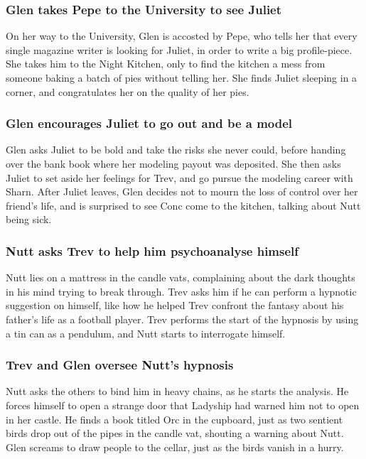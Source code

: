 \subsubsection{\Gls{Glen} takes \Gls{Pepe} to the University to see \Gls{Juliet}}
On her way to the University, \Gls{Glen} is accosted by \Gls{Pepe}, who tells her that every single
magazine writer is looking for \Gls{Juliet}, in order to write a big profile-piece. She takes him
to the Night Kitchen, only to find the kitchen a mess from someone baking a batch of pies without
telling her. She finds \Gls{Juliet} sleeping in a corner, and congratulates her on the quality of
her pies.

\subsubsection{\Gls{Glen} encourages \Gls{Juliet} to go out and be a model}
\Gls{Glen} asks \Gls{Juliet} to be bold and take the risks she never could, before handing over the
bank book where her modeling payout was deposited. She then asks \Gls{Juliet} to set aside her
feelings for \Gls{Trev}, and go pursue the modeling career with \Gls{Sharn}. After \Gls{Juliet}
leaves, \Gls{Glen} decides not to mourn the loss of control over her friend's life, and is surprised
to see \Gls{Conc} come to the kitchen, talking about \Gls{Nutt} being sick.

\subsubsection{\Gls{Nutt} asks \Gls{Trev} to help him psychoanalyse himself}
\Gls{Nutt} lies on a mattress in the candle vats, complaining about the dark thoughts in his mind
trying to break through. \Gls{Trev} asks him if he can perform a hypnotic suggestion on himself,
like how he helped \Gls{Trev} confront the fantasy about his father's life as a football player.
\Gls{Trev} performs the start of the hypnosis by using a tin can as a pendulum, and \Gls{Nutt}
starts to interrogate himself.

\subsubsection{\Gls{Trev} and \Gls{Glen} oversee \Gls{Nutt}'s hypnosis}
\Gls{Nutt} asks the others to bind him in heavy chains, as he starts the analysis. He forces
himself to open a strange door that \Gls{Ladyship} had warned him not to open in her castle. He
finds a book titled Orc in the cupboard, just as two sentient birds drop out of the pipes in the
candle vat, shouting a warning about \Gls{Nutt}. \Gls{Glen} screams to draw people to the cellar,
just as the birds vanish in a hurry.

